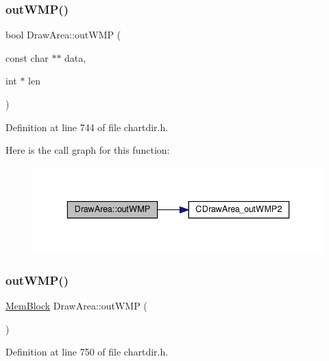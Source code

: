 \subsubsection{\texorpdfstring{out\+W\+M\+P()}{outWMP()}\hspace{0.1cm}{\footnotesize\ttfamily [2/3]}}
{\footnotesize\ttfamily bool Draw\+Area\+::out\+W\+MP (\begin{DoxyParamCaption}\item[{const char $\ast$$\ast$}]{data,  }\item[{int $\ast$}]{len }\end{DoxyParamCaption})\hspace{0.3cm}{\ttfamily [inline]}}



Definition at line 744 of file chartdir.\+h.

Here is the call graph for this function\+:
\nopagebreak
\begin{figure}[H]
\begin{center}
\leavevmode
\includegraphics[width=336pt]{class_draw_area_ad6cc14ce8c201bdf72d9b2a5bc0742d2_cgraph}
\end{center}
\end{figure}
\mbox{\label{class_draw_area_aca33765930d4a4c76bbf476b8580e171}} 
\subsubsection{\texorpdfstring{out\+W\+M\+P()}{outWMP()}\hspace{0.1cm}{\footnotesize\ttfamily [3/3]}}
{\footnotesize\ttfamily \hyperlink{class_mem_block}{Mem\+Block} Draw\+Area\+::out\+W\+MP (\begin{DoxyParamCaption}{ }\end{DoxyParamCaption})\hspace{0.3cm}{\ttfamily [inline]}}



Definition at line 750 of file chartdir.\+h.

